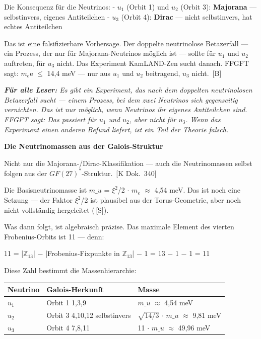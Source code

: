 \documentclass[11pt,oneside]{book}
\newcommand{\status}[1]{\penalty10000\,{\scriptsize\textcolor{gray!60}{[#1]}}}
\newenvironment{laierspur}{%
  \par\vspace{4pt}%
  \noindent\small\itshape\color{blue!60!black}%
  \textbf{Für alle Leser:}\enspace\ignorespaces}{%
  \par\vspace{4pt}\normalsize\normalfont\normalcolor}
\begin{document}
Die Konsequenz für die Neutrinos:
- $
u_1$ (Orbit 1) und $
u_2$ (Orbit 3): \textbf{Majorana} — selbstinvers, eigenes Antiteilchen
- $
u_3$ (Orbit 4): \textbf{Dirac} — nicht selbstinvers, hat echtes Antiteilchen


Das ist eine falsifizierbare Vorhersage. Der doppelte neutrinolose Betazerfall
— ein Prozess, der nur für Majorana-Neutrinos möglich ist — sollte für $
u_1$
und $
u_2$ auftreten, für $
u_3$ nicht. Das Experiment KamLAND-Zen sucht danach.
FFGFT sagt: $m_e$e $\leq$ 14,4 meV — nur aus $
u_1$ und $
u_2$ beitragend, $
u_3$ nicht. \status{B}


\begin{laierspur}
Es gibt ein Experiment, das nach dem doppelten neutrinolosen
Betazerfall sucht — einem Prozess, bei dem zwei Neutrinos sich gegenseitig
vernichten. Das ist nur möglich, wenn Neutrinos ihr eigenes Antiteilchen
sind. FFGFT sagt: Das passiert für $
u_1$ und $
u_2$, aber nicht für $
u_3$. Wenn das
Experiment einen anderen Befund liefert, ist ein Teil der Theorie falsch.
\end{laierspur}

\textbf{Die Neutrinomassen aus der Galois-Struktur}


Nicht nur die Majorana-/Dirac-Klassifikation — auch die Neutrinomassen
selbst folgen aus der $GF(27)^*$-Struktur. \status{K Dok.~340}


Die Basisneutrinomasse ist $m\_
u$ = $\xi^2$/2 $\cdot$ $m_e$ $\approx$ 4,54 meV. Das ist noch
eine Setzung — der Faktor $\xi^2$/2 ist plausibel aus der Torus-Geometrie,
aber noch nicht vollständig hergeleitet (\status{S}).


Was dann folgt, ist algebraisch präzise. Das maximale Element des vierten
Frobenius-Orbits ist 11 — denn:


11 = |$\mathbb{Z}_{13}$| $-$ |Frobenius-Fixpunkte in $\mathbb{Z}_{13}$| $-$ 1 = 13 $-$ 1 $-$ 1 = 11


Diese Zahl bestimmt die Massenhierarchie:


\begin{center}
\small
\begin{tabular}{lp{2.8cm}p{3cm}}
\toprule
Neutrino & Galois-Herkunft & Masse \\
\midrule
$
u_1$ & Orbit 1 {1,3,9} & $m\_
u$ $\approx$ 4,54 meV \\
$
u_2$ & Orbit 3 {4,10,12} selbstinvers & $\sqrt{14/3}$ $\cdot$ $m\_
u$ $\approx$ 9,81 meV \\
$
u_3$ & Orbit 4 {7,8,11} & 11 $\cdot$ $m\_
u$ $\approx$ 49,96 meV \\
\bottomrule
\end{tabular}
\end{center}
\end{document}
